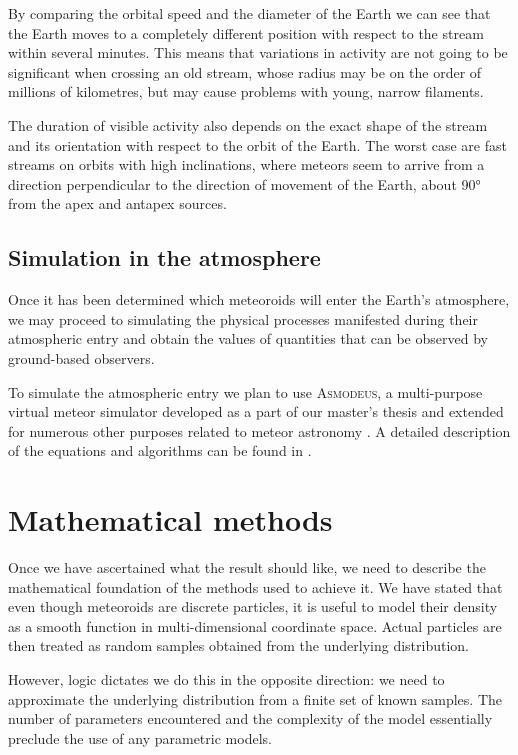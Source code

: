         By comparing the orbital speed and the diameter of the Earth we can see that the Earth moves
        to a completely different position with respect to the stream within several minutes.
        This means that variations in activity are not going to be significant when crossing an old stream,
        whose radius may be on the order of millions of kilometres, but may cause problems with young, narrow filaments.

        The duration of visible activity also depends on the exact shape of the stream and its orientation with respect to the orbit of the Earth.
        The worst case are fast streams on orbits with high inclinations, where meteors seem to arrive
        from a direction perpendicular to the direction of movement of the Earth, about \ang{90} from the apex and antapex sources.

    \subsection{Simulation in the atmosphere} \label{mia}
        Once it has been determined which meteoroids will enter the Earth's atmosphere, we may proceed to simulating
        the physical processes manifested during their atmospheric entry and obtain the values of quantities
        that can be observed by ground-based observers.

        To simulate the atmospheric entry we plan to use \textsc{Asmodeus},
        a multi-purpose virtual meteor simulator developed as a part of our master's thesis and extended for numerous
        other purposes related to meteor astronomy \citep{balaz-thesis}. A detailed description
        of the equations and algorithms can be found in \citep{balaz+2020}.

\section{Mathematical methods} \label{mm}
    Once we have ascertained what the result should like, we need to describe the mathematical foundation of the methods used to achieve it.
    We have stated that even though meteoroids are discrete particles, it is useful to model their density
    as a smooth function in multi-dimensional coordinate space.
    Actual particles are then treated as random samples obtained from the underlying distribution.

    However, logic dictates we do this in the opposite direction: we need to approximate
    the underlying distribution from a finite set of known samples.
    The number of parameters encountered and the complexity of the model essentially preclude the use of any parametric models.

